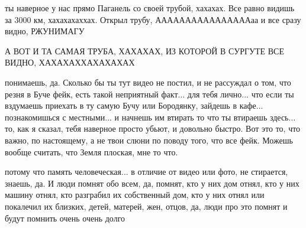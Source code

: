 ты наверное у нас прямо Паганель со своей трубой, хахахах. Все равно видишь за
3000 км, хахахахаххах. Открыл трубу, ААААААААААААААААаа и все сразу видно,
РЖУНИМАГУ

А ВОТ И ТА САМАЯ ТРУБА, ХАХАХАХ, ИЗ КОТОРОЙ В СУРГУТЕ ВСЕ ВИДНО,
ХАХАХАХХАХАХАХАХ

понимаешь, да. Сколько бы ты тут видео не постил, и не рассуждал о том, что
резня в Буче фейк, есть такой неприятный факт... для тебя лично... что если ты
вздумаешь приехать в ту самую Бучу или Бородянку, зайдешь в кафе...
познакомишься с местными... и начнешь им втирать то что ты втираешь здесь...
то, как я сказал, тебя наверное просто убьют, и довольно быстро. Вот это то,
что важно, по настоящему, а не твои слюни по поводу того, что все фейк. Можешь
вообще считать, что Земля плоская, мне то что.

потому что память человеческая... в отличие от видео или фото, не стирается,
знаешь, да. И люди помнят обо всем, да, помнят, кто у них дом отнял, кто у них
машину отнял, кто разграбил их собственный дом, кто у них отнял или покалечил
их близких, детей, матерей, жен, отцов, да, люди про это помнят и будут помнить
очень очень долго

